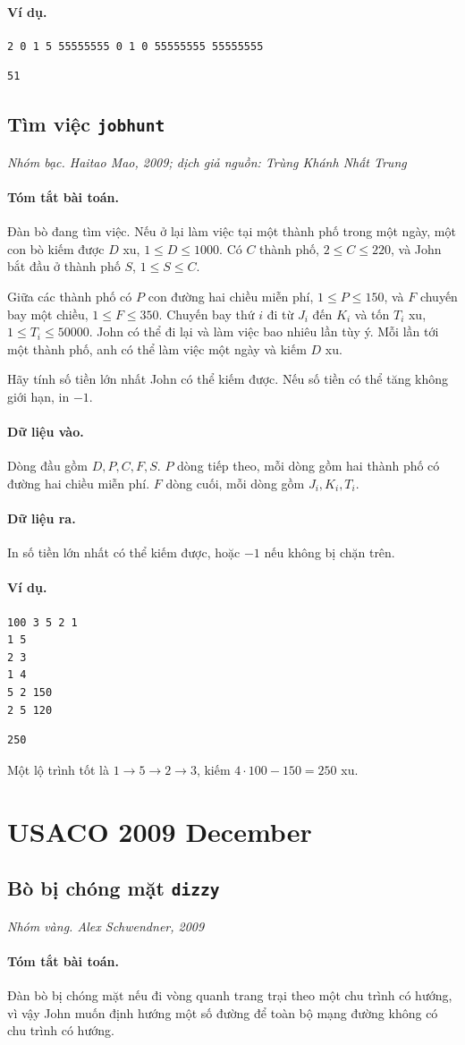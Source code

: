 \documentclass[11pt]{article}
\newcommand{\problem}[4]{%
  \subsection[#1 (#2)]{#1 \hfill {\normalsize\texttt{#2}}}%
  \noindent\textit{#3. #4}\par\smallskip
}
\newcommand{\iosec}[1]{\paragraph{#1}}
\begin{document}
\iosec{Ví dụ.}
\begin{verbatim}
2 0 1 5 55555555 0 1 0 55555555 55555555
\end{verbatim}

\begin{verbatim}
51
\end{verbatim}

\problem{Tìm việc}{jobhunt}{Nhóm bạc}{Haitao Mao, 2009; dịch giả nguồn: Trùng Khánh Nhất Trung}

\iosec{Tóm tắt bài toán.}
Đàn bò đang tìm việc. Nếu ở lại làm việc tại một thành phố trong một ngày,
một con bò kiếm được \(D\) xu, \(1\le D\le 1000\). Có \(C\) thành phố,
\(2\le C\le 220\), và John bắt đầu ở thành phố \(S\),
\(1\le S\le C\).

Giữa các thành phố có \(P\) con đường hai chiều miễn phí,
\(1\le P\le 150\), và \(F\) chuyến bay một chiều,
\(1\le F\le 350\). Chuyến bay thứ \(i\) đi từ \(J_i\) đến \(K_i\) và tốn
\(T_i\) xu, \(1\le T_i\le 50000\). John có thể đi lại và làm việc bao nhiêu
lần tùy ý. Mỗi lần tới một thành phố, anh có thể làm việc một ngày và kiếm
\(D\) xu.

Hãy tính số tiền lớn nhất John có thể kiếm được. Nếu số tiền có thể tăng
không giới hạn, in \(-1\).

\iosec{Dữ liệu vào.}
Dòng đầu gồm \(D,P,C,F,S\). \(P\) dòng tiếp theo, mỗi dòng gồm hai thành phố
có đường hai chiều miễn phí. \(F\) dòng cuối, mỗi dòng gồm \(J_i,K_i,T_i\).

\iosec{Dữ liệu ra.}
In số tiền lớn nhất có thể kiếm được, hoặc \(-1\) nếu không bị chặn trên.

\iosec{Ví dụ.}
\begin{verbatim}
100 3 5 2 1
1 5
2 3
1 4
5 2 150
2 5 120
\end{verbatim}

\begin{verbatim}
250
\end{verbatim}

Một lộ trình tốt là \(1\to5\to2\to3\), kiếm \(4\cdot100-150=250\) xu.

\section{USACO 2009 December}

\problem{Bò bị chóng mặt}{dizzy}{Nhóm vàng}{Alex Schwendner, 2009}

\iosec{Tóm tắt bài toán.}
Đàn bò bị chóng mặt nếu đi vòng quanh trang trại theo một chu trình có hướng,
vì vậy John muốn định hướng một số đường để toàn bộ mạng đường không có chu
trình có hướng.
\end{document}
